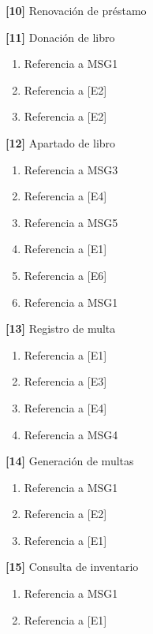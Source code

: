 \begin{Citemize}
\begin{enumerate}
		\end{enumerate}
	\item {\bf [10]} Renovación de préstamo
	\item {\bf [11]} Donación de libro
		\begin{enumerate}
			\item Referencia a MSG1
			\item Referencia a [E2]
			\item Referencia a [E2]
		\end{enumerate}
	\item {\bf [12]} Apartado de libro
		\begin{enumerate}
			\item Referencia a MSG3
			\item Referencia a [E4]
			\item Referencia a MSG5
			\item Referencia a [E1]
			\item Referencia a [E6]
			\item Referencia a MSG1
		\end{enumerate}
	\item {\bf [13]} Registro de multa
		\begin{enumerate}
			\item Referencia a [E1]
			\item Referencia a [E3]
			\item Referencia a [E4]
			\item Referencia a MSG4
		\end{enumerate}
	\item {\bf [14]} Generación de multas
		\begin{enumerate}
			\item Referencia a MSG1
			\item Referencia a [E2]
			\item Referencia a [E1]
		\end{enumerate}
	\item {\bf [15]} Consulta de inventario
		\begin{enumerate}
			\item Referencia a MSG1
			\item Referencia a [E1]
		\end{enumerate}
	\end{Citemize}

